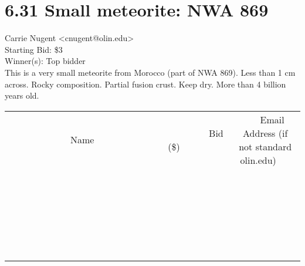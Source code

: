 \documentclass[11pt]{article}
\begin{document}
					\section*{6.31 Small meteorite: NWA 869}
					Carrie Nugent <cnugent@olin.edu> \\
					Starting Bid: \$3 \\
					Winner(s): Top bidder \\
					This is a very small meteorite from Morocco (part of NWA 869). Less than 1 cm across. Rocky composition. Partial fusion crust. Keep dry. More than 4 billion years old. \\
					[6ex]
					\begin{tabular}{c c c}
						~~~~~~~~~~~~~Name~~~~~~~~~~~~~ & ~~~~~~~~~Bid (\$)~~~~~~~~~ & ~~~Email Address (if not standard olin.edu)~~~ \\
				
 & & \\
\hline
 & & \\
\hline
 & & \\
\hline
 & & \\
\hline
 & & \\
\hline
 & & \\
\hline
 & & \\
\hline
 & & \\
\hline
 & & \\
\hline
 & & \\
\hline
 & & \\
\hline
 & & \\
\hline
 & & \\
\hline
 & & \\
\hline
 & & \\
\hline
 & & \\
\hline
 & & \\
\hline
 & & \\
\hline
 & & \\
\hline
 & & \\
\hline
 & & \\
\hline
 & & \\
\hline
 & & \\
\hline
 & & \\
\hline
 & & \\
\hline
 & & \\
\hline
					\end{tabular}
					\clearpage
				
\end{document}
